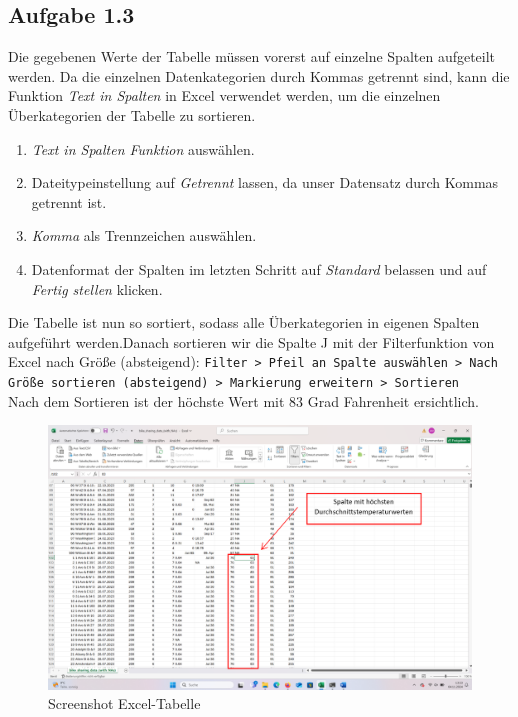 \documentclass[a4paper, 12pt]{article}
\begin{document}
\subsection{Aufgabe 1.3}
Die gegebenen Werte der Tabelle müssen vorerst auf einzelne Spalten aufgeteilt werden. Da die einzelnen Datenkategorien durch Kommas getrennt sind, kann die Funktion \textit{Text in Spalten} in Excel verwendet werden, um die einzelnen Überkategorien der Tabelle zu sortieren.

\begin{enumerate}
    \item \textit{Text in Spalten Funktion} auswählen.
    \item Dateitypeinstellung auf \textit{Getrennt} lassen, da unser Datensatz durch Kommas getrennt ist.
    \item \textit{Komma} als Trennzeichen auswählen.
    \item Datenformat der Spalten im letzten Schritt auf \textit{Standard} belassen und auf \textit{Fertig stellen} klicken.
\end{enumerate}

Die Tabelle ist nun so sortiert, sodass alle Überkategorien in eigenen Spalten aufgeführt werden.\newline Danach sortieren wir die Spalte J mit der Filterfunktion von Excel nach Größe (absteigend): \texttt{Filter > Pfeil an Spalte auswählen > Nach Größe sortieren (absteigend) > Markierung erweitern > Sortieren}
\\
\newline
Nach dem Sortieren ist der höchste Wert mit 83 Grad Fahrenheit ersichtlich.

\newpage

\begin{figure}[!htb]
\centering
\includegraphics[scale=.4]{Screenshot 2024-11-26 201311}
\caption{Screenshot Excel-Tabelle}
\label{fig:Screenshot Excel-Tabelle}
\end{figure}
\end{document}
